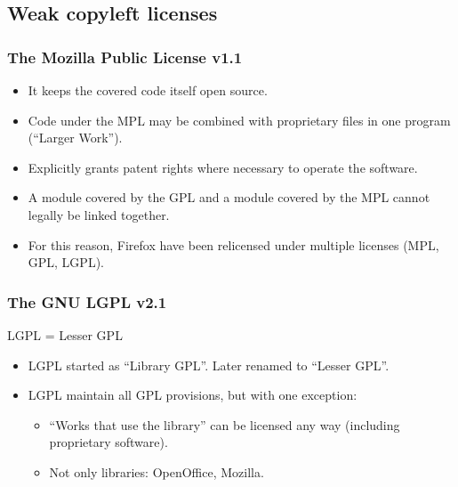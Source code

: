 
\subsection{Weak copyleft licenses}

\begin{frame}
\frametitle{The Mozilla Public License v1.1}

\begin{itemize}
\item It keeps the covered code itself open source.
\item Code under the MPL may be combined with proprietary files in one program (``Larger Work'').
\item Explicitly grants patent rights where necessary to operate the software.
\item A module covered by the GPL and a module covered by the MPL cannot legally be linked together.
\item For this reason, Firefox have been relicensed under multiple licenses (MPL, GPL, LGPL).

\end{itemize}

\end{frame}


\begin{frame}
\frametitle{The GNU LGPL v2.1}

\begin{center}
LGPL = Lesser GPL
\end{center}

\begin{itemize}
\item LGPL started as ``Library GPL''. Later renamed to ``Lesser
  GPL''.
\item LGPL maintain all GPL provisions, but with one exception:
\begin{itemize}
  \item ``Works that use the library'' \alert{can be licensed any way} (including proprietary software).
  \item Not only libraries: OpenOffice, Mozilla.
\end{itemize}
\end{itemize}

\end{frame}

